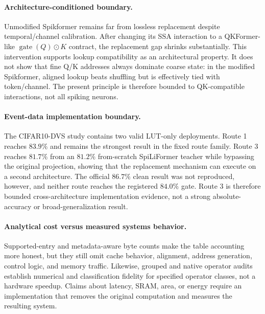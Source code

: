 \paragraph{Architecture-conditioned boundary.}
Unmodified Spikformer remains far from lossless replacement despite
temporal/channel calibration. After changing its SSA interaction to a
QKFormer-like $\operatorname{gate}(Q)\odot K$ contract, the replacement gap
shrinks substantially. This intervention supports lookup compatibility as an
architectural property. It does not show that fine Q/K addresses always
dominate coarse state: in the modified Spikformer, aligned lookup beats
shuffling but is effectively tied with token/channel. The present principle is
therefore bounded to QK-compatible interactions, not all spiking neurons.

\paragraph{Event-data implementation boundary.}
The CIFAR10-DVS study contains two valid LUT-only deployments. Route 1 reaches
$83.9\%$ and remains the strongest result in the fixed route family. Route 3
reaches $81.7\%$ from an $81.2\%$ from-scratch SpiLiFormer teacher while
bypassing the original projection, showing that the replacement mechanism can
execute on a second architecture. The official $86.7\%$ clean result was not
reproduced, however, and neither route reaches the registered $84.0\%$ gate.
Route 3 is therefore bounded cross-architecture implementation evidence, not a
strong absolute-accuracy or broad-generalization result.

\paragraph{Analytical cost versus measured systems behavior.}
Supported-entry and metadata-aware byte counts make the table accounting more
honest, but they still omit cache behavior, alignment, address generation,
control logic, and memory traffic. Likewise, grouped and native operator
audits establish numerical and classification fidelity for specified operator
classes, not a hardware speedup. Claims about latency, SRAM, area, or energy
require an implementation that removes the original computation and measures
the resulting system.
